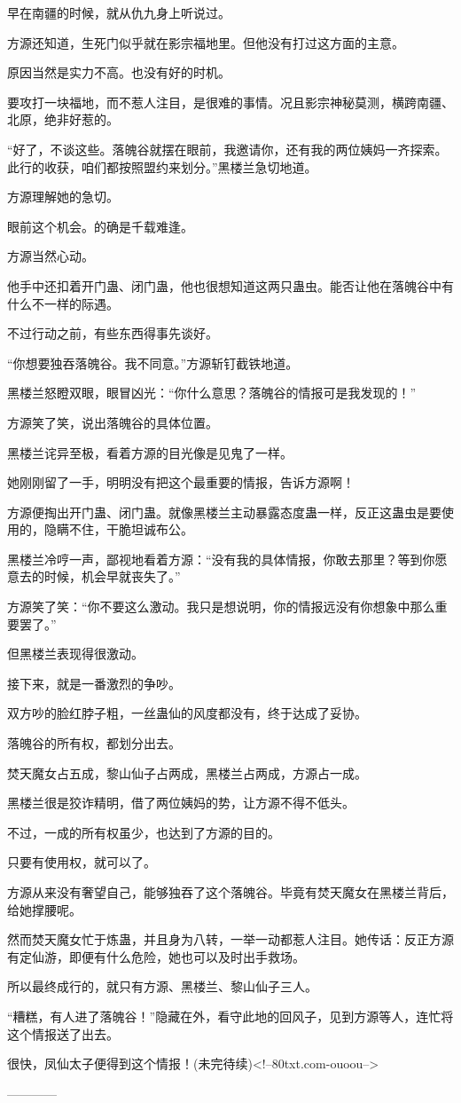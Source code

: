 \begin{this_body}
早在南疆的时候，就从仇九身上听说过。

方源还知道，生死门似乎就在影宗福地里。但他没有打过这方面的主意。

原因当然是实力不高。也没有好的时机。

要攻打一块福地，而不惹人注目，是很难的事情。况且影宗神秘莫测，横跨南疆、北原，绝非好惹的。

“好了，不谈这些。落魄谷就摆在眼前，我邀请你，还有我的两位姨妈一齐探索。此行的收获，咱们都按照盟约来划分。”黑楼兰急切地道。

方源理解她的急切。

眼前这个机会。的确是千载难逢。

方源当然心动。

他手中还扣着开门蛊、闭门蛊，他也很想知道这两只蛊虫。能否让他在落魄谷中有什么不一样的际遇。

不过行动之前，有些东西得事先谈好。

“你想要独吞落魄谷。我不同意。”方源斩钉截铁地道。

黑楼兰怒瞪双眼，眼冒凶光：“你什么意思？落魄谷的情报可是我发现的！”

方源笑了笑，说出落魄谷的具体位置。

黑楼兰诧异至极，看着方源的目光像是见鬼了一样。

她刚刚留了一手，明明没有把这个最重要的情报，告诉方源啊！

方源便掏出开门蛊、闭门蛊。就像黑楼兰主动暴露态度蛊一样，反正这蛊虫是要使用的，隐瞒不住，干脆坦诚布公。

黑楼兰冷哼一声，鄙视地看着方源：“没有我的具体情报，你敢去那里？等到你愿意去的时候，机会早就丧失了。”

方源笑了笑：“你不要这么激动。我只是想说明，你的情报远没有你想象中那么重要罢了。”

但黑楼兰表现得很激动。

接下来，就是一番激烈的争吵。

双方吵的脸红脖子粗，一丝蛊仙的风度都没有，终于达成了妥协。

落魄谷的所有权，都划分出去。

焚天魔女占五成，黎山仙子占两成，黑楼兰占两成，方源占一成。

黑楼兰很是狡诈精明，借了两位姨妈的势，让方源不得不低头。

不过，一成的所有权虽少，也达到了方源的目的。

只要有使用权，就可以了。

方源从来没有奢望自己，能够独吞了这个落魄谷。毕竟有焚天魔女在黑楼兰背后，给她撑腰呢。

然而焚天魔女忙于炼蛊，并且身为八转，一举一动都惹人注目。她传话：反正方源有定仙游，即便有什么危险，她也可以及时出手救场。

所以最终成行的，就只有方源、黑楼兰、黎山仙子三人。

“糟糕，有人进了落魄谷！”隐藏在外，看守此地的回风子，见到方源等人，连忙将这个情报送了出去。

很快，凤仙太子便得到这个情报！(未完待续)<!--80txt.com-ouoou-->

------------

\end{this_body}

